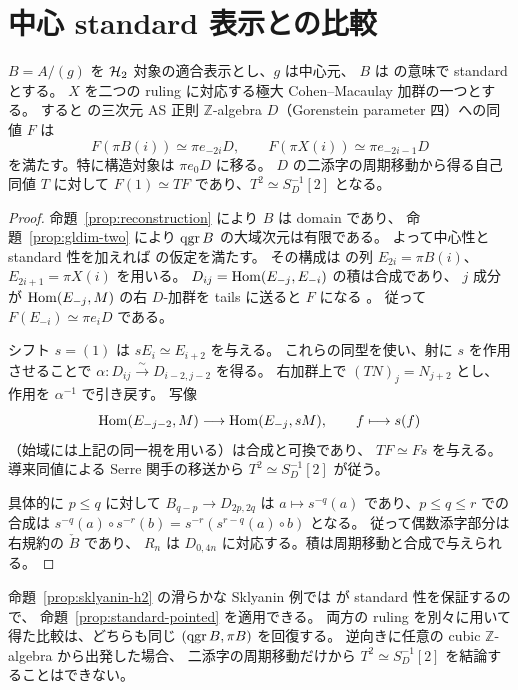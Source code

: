 \section{中心 standard 表示との比較}
\label{sec:standard-comparison}

\begin{proposition}[標識とシフトの移送]
\label{prop:standard-pointed}
$B=A/(g)$ を $\mathcal H_2$ 対象の適合表示とし、$g$ は中心元、
$B$ は \cite{MN2025} の意味で standard とする。
$X$ を二つの ruling に対応する極大 Cohen--Macaulay 加群の一つとする。
すると \cite[Theorem 6.13]{MN2025} の三次元 AS 正則
$\mathbb Z$-algebra $D$（Gorenstein parameter 四）への同値 $F$ は
\[
 F(\pi B(i))\simeq\pi e_{-2i}D,\qquad
 F(\pi X(i))\simeq\pi e_{-2i-1}D
\]
を満たす。特に構造対象は $\pi e_0D$ に移る。
$D$ の二添字の周期移動から得る自己同値 $T$ に対して
$F(1)\simeq TF$ であり、$T^2\simeq S_D^{-1}[2]$ となる。
\end{proposition}

\begin{proof}
命題~\ref{prop:reconstruction} により $B$ は domain であり、
命題~\ref{prop:gldim-two} により $\operatorname{qgr} B$ の大域次元は有限である。
よって中心性と standard 性を加えれば
\cite[arXiv v1, Theorem 6.13]{MN2025} の仮定を満たす。
その構成は \cite[Theorem 5.16]{MU2021} の列
$E_{2i}=\pi B(i)$、$E_{2i+1}=\pi X(i)$ を用いる。
$D_{ij}=\operatorname{Hom}(E_{-j},E_{-i})$ の積は合成であり、
$j$ 成分が $\operatorname{Hom}(E_{-j},M)$ の右 $D$-加群を tails に送ると $F$ になる
\cite[arXiv v1, Definition 5.1, Theorems 5.8 and 6.4]{MN2025}。
従って $F(E_{-i})\simeq\pi e_iD$ である。

シフト $s=(1)$ は $s E_i\simeq E_{i+2}$ を与える。
これらの同型を使い、射に $s$ を作用させることで
$\alpha:D_{ij}\xrightarrow{\sim}D_{i-2,j-2}$ を得る。
右加群上で $(TN)_j=N_{j+2}$ とし、作用を $\alpha^{-1}$ で引き戻す。
写像
\[
 \operatorname{Hom}(E_{-j-2},M)\longrightarrow\operatorname{Hom}(E_{-j},sM),
 \qquad f\longmapsto s(f)
\]
（始域には上記の同一視を用いる）は合成と可換であり、
$TF\simeq Fs$ を与える。導来同値による Serre 関手の移送から
$T^2\simeq S_D^{-1}[2]$ が従う。

具体的に $p\le q$ に対して $B_{q-p}\to D_{2p,2q}$ は
$a\mapsto s^{-q}(a)$ であり、$p\le q\le r$ での合成は
$s^{-q}(a)\circ s^{-r}(b)=s^{-r}(s^{r-q}(a)\circ b)$ となる。
従って偶数添字部分は右規約の $\check B$ であり、
$R_n$ は $D_{0,4n}$ に対応する。積は周期移動と合成で与えられる。
\end{proof}

命題~\ref{prop:sklyanin-h2} の滑らかな Sklyanin 例では
\cite[Theorem 5.5]{MUW2026} が standard 性を保証するので、
命題~\ref{prop:standard-pointed} を適用できる。
両方の ruling を別々に用いて得た比較は、どちらも同じ $(\operatorname{qgr} B,\pi B)$ を回復する。
逆向きに任意の cubic $\mathbb Z$-algebra から出発した場合、
二添字の周期移動だけから $T^2\simeq S_D^{-1}[2]$ を結論することはできない。

